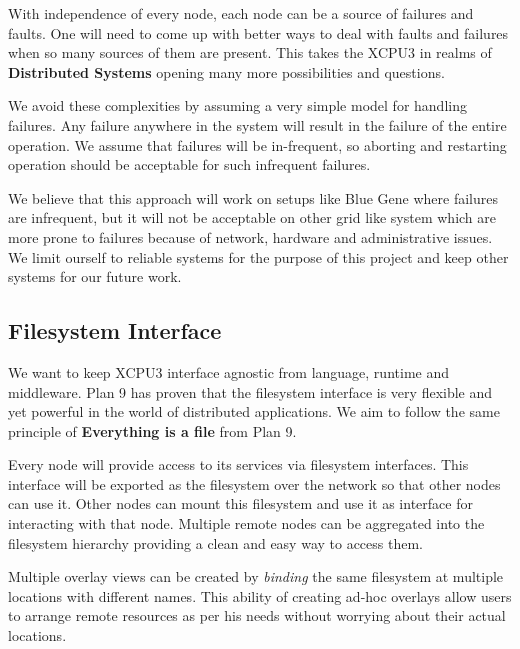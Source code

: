 With independence of every node, each node can be a source of failures and faults.
One will need to come up with better ways to deal with faults and
failures when so many sources of them are present.  This takes the XCPU3 in
realms of \textbf{Distributed Systems} opening many more possibilities and
questions.

We avoid these complexities by assuming a very simple model for handling
failures.  Any failure anywhere in the system will result in the failure of the entire
operation.  We assume that failures will be in-frequent, so aborting and
restarting operation should be acceptable for such infrequent failures.

We believe that this approach will work on setups like Blue Gene where failures
are infrequent, but it will not be acceptable on other grid like system
which are more prone to failures because of network, hardware and
administrative issues.  We limit ourself to reliable systems for the purpose of
this project and keep other systems for our future work.


\subsection{Filesystem Interface}
We want to keep XCPU3 interface agnostic from language,
runtime and middleware.  Plan 9 has proven that the filesystem interface is very
flexible and yet powerful in the world of distributed applications.  We aim to 
follow the same principle of \textbf{Everything is a file} from Plan 9.

Every node will provide access to its services via filesystem interfaces.
This interface will be exported as the filesystem over the network so that other nodes can use it.
Other nodes can mount this filesystem and use it as interface for interacting
with that node.  Multiple remote nodes can be aggregated into the filesystem 
hierarchy providing a clean and easy way to access them.

Multiple overlay views
can be created by \textit{binding} the same filesystem at multiple locations with
different names.  This ability of creating ad-hoc overlays allow users to
arrange remote resources as per his needs without worrying about their actual
locations.

